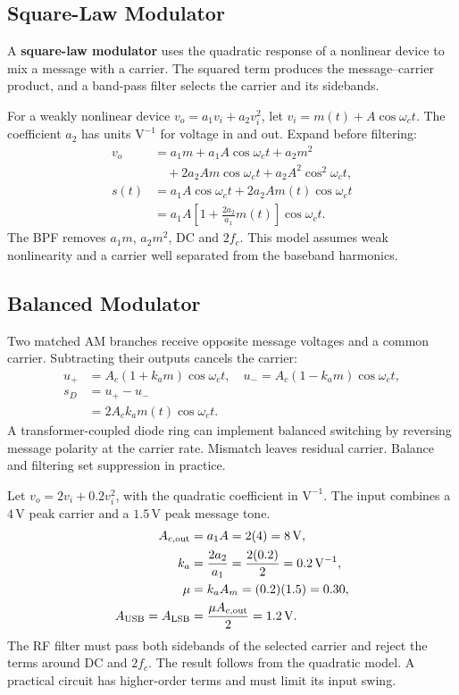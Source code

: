 \documentclass[12pt,a4paper]{article}
\begin{document}
\subsection{Square-Law Modulator}
\begin{tcolorbox}[defbox, title={Square-Law Modulator}]
A \textbf{square-law modulator} uses the quadratic response of a nonlinear device to mix a message with a carrier. The squared term produces the message--carrier product, and a band-pass filter selects the carrier and its sidebands.
\end{tcolorbox}

For a weakly nonlinear device $v_o=a_1v_i+a_2v_i^2$, let $v_i=m(t)+A\cos\omega_ct$. The coefficient $a_2$ has units $\mathrm{V^{-1}}$ for voltage in and out. Expand before filtering:
\[
\begin{aligned}
 v_o &= a_1m+a_1 A\cos\omega_ct+a_2m^2\\
     &\quad+2a_2Am\cos\omega_ct+a_2A^2\cos^2\omega_ct,\\
 s(t)&=a_1A\cos\omega_ct+2a_2Am(t)\cos\omega_ct\\
     &=a_1A\left[1+\frac{2a_2}{a_1}m(t)\right]\cos\omega_ct.
\end{aligned}
\]
The BPF removes $a_1m$, $a_2m^2$, DC and $2f_c$. This model assumes weak nonlinearity and a carrier well separated from the baseband harmonics.

\subsection{Balanced Modulator}
Two matched AM branches receive opposite message voltages and a common carrier. Subtracting their outputs cancels the carrier:
\[
\begin{aligned}
 u_+&=A_c(1+k_am)\cos\omega_ct,\quad
 u_-=A_c(1-k_am)\cos\omega_ct,\\
 s_D&=u_+-u_-\\
    &=2A_ck_a m(t)\cos\omega_ct.
\end{aligned}
\]
A transformer-coupled diode ring can implement balanced switching by reversing message polarity at the carrier rate. Mismatch leaves residual carrier. Balance and filtering set suppression in practice.

\begin{tcolorbox}[examplebox, title={Square-Law Modulator with a Specified Carrier and Tone}]
Let $v_o=2v_i+0.2v_i^2$, with the quadratic coefficient in $\mathrm{V^{-1}}$. The input combines a $4\,\mathrm V$ peak carrier and a $1.5\,\mathrm V$ peak message tone.
\[
\begin{aligned}
 A_{c,\rm out} &= a_1A=2(4)=8\,\mathrm V,\\
 k_a &= \frac{2a_2}{a_1}=\frac{2(0.2)}{2}=0.2\,\mathrm{V^{-1}},\\
 \mu&=k_aA_m=(0.2)(1.5)=0.30,\\
 A_{\rm USB}=A_{\rm LSB}&=\frac{\mu A_{c,\rm out}}2=1.2\,\mathrm V.
\end{aligned}
\]
The RF filter must pass both sidebands of the selected carrier and reject the terms around DC and $2f_c$. The result follows from the quadratic model. A practical circuit has higher-order terms and must limit its input swing.
\end{tcolorbox}
\end{document}
